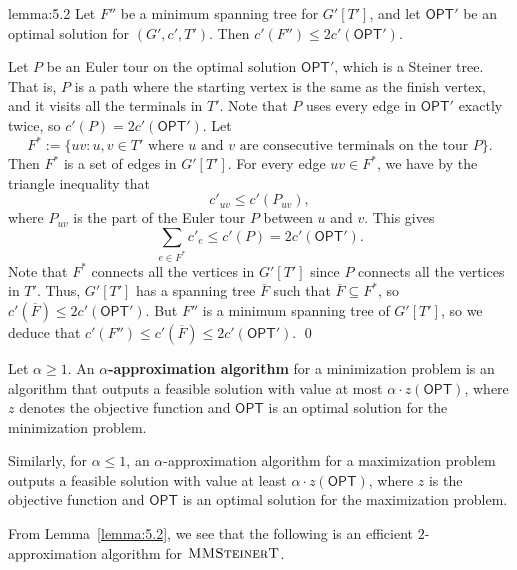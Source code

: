 \begin{lemma}{lemma:5.2}
    Let $F''$ be a minimum spanning tree for $G'[T']$, and let $\textsf{OPT}'$ be 
    an optimal solution for $(G', c', T')$. Then $c'(F'') \leq 2c'(\textsf{OPT}')$.
\end{lemma}\vspace{-0.25cm}
\begin{pf}
    Let $P$ be an Euler tour on the optimal solution $\textsf{OPT}'$, which is 
    a Steiner tree. That is, $P$ is a path where the starting vertex is 
    the same as the finish vertex, and it visits all the terminals in $T'$.
    Note that $P$ uses every edge in $\textsf{OPT}'$ exactly twice, so 
    $c'(P) = 2c'(\textsf{OPT}')$. Let 
    \[ F^* := \{uv : u, v \in T' \text{ where } u \text{ and } v \text{ 
        are consecutive terminals on the tour $P$}\}. \] 
    Then $F^*$ is a set of edges in $G'[T']$. For every edge $uv \in F^*$, 
    we have by the triangle inequality that 
    \[ c'_{uv} \leq c'(P_{uv}), \] 
    where $P_{uv}$ is the part of the Euler tour 
    $P$ between $u$ and $v$. This gives 
    \[ \sum_{e\in F^*} c'_e \leq c'(P) = 2c'(\textsf{OPT}'). \] 
    Note that $F^*$ connects all the vertices in $G'[T']$ since $P$ connects 
    all the vertices in $T'$. Thus, $G'[T']$ has a spanning tree $\overline{F}$ 
    such that $\overline{F} \subseteq F^*$, so $c'(\overline{F}) \leq 
    2c'(\textsf{OPT}')$. But $F''$ is a minimum spanning tree of $G'[T']$, 
    so we deduce that $c'(F'') \leq c'(\overline{F}) \leq 2c'(\textsf{OPT}')$. \qed
\end{pf}\vspace{-0.25cm}
Let $\alpha \geq 1$. An {\bf $\alpha$-approximation algorithm} for a minimization problem is an 
algorithm that outputs a feasible solution with value at most 
$\alpha \cdot z(\textsf{OPT})$, where $z$ denotes the objective 
function and $\textsf{OPT}$ is an optimal solution 
for the minimization problem.

Similarly, for $\alpha \leq 1$, an $\alpha$-approximation algorithm for a 
maximization problem outputs a feasible solution with 
value at least $\alpha \cdot z(\textsf{OPT})$, where $z$ is the objective 
function and $\textsf{OPT}$ is an optimal solution 
for the maximization problem.

From Lemma~\ref{lemma:5.2}, we see that the following is an efficient 
$2$-approximation algorithm for $\textsc{MMSteinerT}$.

